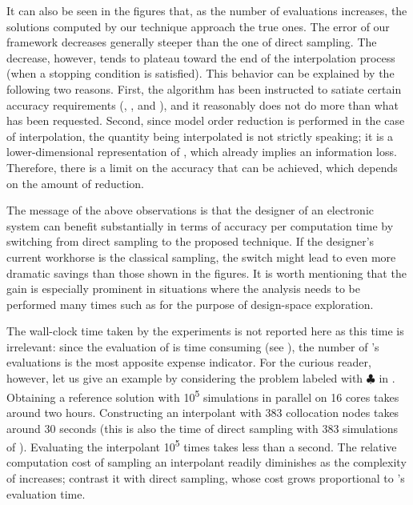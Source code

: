 It can also be seen in the figures that, as the number of evaluations increases,
the solutions computed by our technique approach the true ones. The error of our
framework decreases generally steeper than the one of direct sampling. The
decrease, however, tends to plateau toward the end of the interpolation process
(when a stopping condition is satisfied). This behavior can be explained by the
following two reasons. First, the algorithm has been instructed to satiate
certain accuracy requirements (, , and ), and it
reasonably does not do more than what has been requested. Second, since model
order reduction is performed in the case of interpolation, the quantity being
interpolated is not \g strictly speaking; it is a lower-dimensional
representation of \g, which already implies an information loss. Therefore,
there is a limit on the accuracy that can be achieved, which depends on the
amount of reduction.

The message of the above observations is that the designer of an electronic
system can benefit substantially in terms of accuracy per computation time by
switching from direct sampling to the proposed technique. If the designer's
current workhorse is the classical  sampling, the switch might lead to
even more dramatic savings than those shown in the figures. It is worth
mentioning that the gain is especially prominent in situations where the
analysis needs to be performed many times such as for the purpose of
design-space exploration.

\begin{remark}
The wall-clock time taken by the experiments is not reported here as this time
is irrelevant: since the evaluation of \g is time consuming (see
), the number of \g's evaluations is the most apposite
expense indicator. For the curious reader, however, let us give an example by
considering the problem labeled with $\clubsuit$ in
. Obtaining a reference solution with
10\textsuperscript{5} simulations in parallel on 16 cores takes around two
hours. Constructing an interpolant with 383 collocation nodes takes around 30
seconds (this is also the time of direct sampling with 383 simulations of \g).
Evaluating the interpolant 10\textsuperscript{5} times takes less than a second.
The relative computation cost of sampling an interpolant readily diminishes as
the complexity of \g increases; contrast it with direct sampling, whose cost
grows proportional to \g's evaluation time.
\end{remark}

